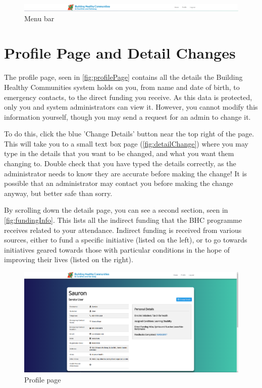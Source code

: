 \documentclass{bhcguides}
\begin{document}
\begin{figure}[h]
 \centerline{\includegraphics[width=\textwidth, height=\textheight, keepaspectratio]{menubar.png}}
 \caption{Menu bar}
 \label{fig:menuBar}
\end{figure}

\pagebreak

\section{Profile Page and Detail Changes}
\label{sec:profile}

The profile page, seen in \autoref{fig:profilePage} contains all the details the Building Healthy Communities system holds on you, from name and date of birth, to emergency contacts, to the direct funding you receive. As this data is protected, only you and system administrators can view it. However, you cannot modify this information yourself, though you may send a request for an admin to change it. 

To do this, click the blue 'Change Details' button near the top right of the page. This will take you to a small text box page (\autoref{fig:detailChange}) where you may type in the details that you want to be changed, and what you want them changing to. Double check that you have typed the details correctly, as the administrator needs to know they are accurate before making the change! It is possible that an administrator may contact you before making the change anyway, but better safe than sorry.

By scrolling down the details page, you can see a second section, seen in \autoref{fig:fundingInfo}. This lists all the indirect funding that the BHC programme receives related to your attendance. Indirect funding is received from various sources, either to fund a specific initiative (listed on the left), or to go towards initiatives geared towards those with particular conditions in the hope of improving their lives (listed on the right).

\begin{figure}[h]
 \centerline{\includegraphics[width=\textwidth, height=\textheight, keepaspectratio]{profilepage.png}}
 \caption{Profile page}
 \label{fig:profilePage}
\end{figure}
\end{document}
